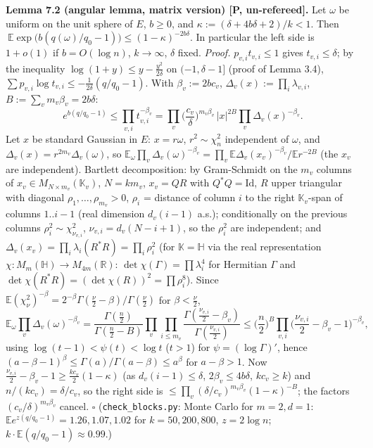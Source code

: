 \textbf{Lemma 7.2 (angular lemma, matrix version) {[}P, un-refereed{]}.} Let \(\omega\) be uniform on the unit sphere of \(E\), \(b\ge0\), and \(\kappa:=(\delta+4b\delta+2)/k<1\). Then \(\ \mathbb E\exp\big(b(q(\omega)/q_0-1)\big)\le(1-\kappa)^{-2b\delta}\). In particular the left side is \(1+o(1)\) if \(b=O(\log n)\), \(k\to\infty\), \(\delta\) fixed.
\emph{Proof.} \(p_{v,i}t_{v,i}\le1\) gives \(t_{v,i}\le\delta\); by the inequality \(\log(1+y)\le y-\frac{y^2}{2\delta}\) on \((-1,\delta-1]\) (proof of Lemma 3.4), \(\sum p_{v,i}\log t_{v,i}\le-\frac1{2\delta}(q/q_0-1)\). With \(\beta_v:=2bc_v\), \(\Delta_v(x):=\prod_i\lambda_{v,i}\), \(B:=\sum_vm_v\beta_v=2b\delta\):
\[e^{b(q/q_0-1)}\le\prod_{v,i}t_{v,i}^{-\beta_v}=\prod_v\Big(\frac{c_v}{\delta}\Big)^{m_v\beta_v}\,|x|^{2B}\prod_v\Delta_v(x)^{-\beta_v}.\]
Let \(x\) be standard Gaussian in \(E\): \(x=r\omega\), \(r^2\sim\chi^2_n\) independent of \(\omega\), and \(\Delta_v(x)=r^{2m_v}\Delta_v(\omega)\), so \(\mathbb E_\omega\prod_v\Delta_v(\omega)^{-\beta_v}=\prod_v\mathbb E\Delta_v(x_v)^{-\beta_v}/\mathbb E r^{-2B}\) (the \(x_v\) are independent). Bartlett decomposition: by Gram-Schmidt on the \(m_v\) columns of \(x_v\in M_{N\times m_v}(\mathbb K_v)\), \(N=km_v\), \(x_v=QR\) with \(Q^*Q=\mathrm{Id}\), \(R\) upper triangular with diagonal \(\rho_1,\dots,\rho_{m_v}>0\), \(\rho_i\) = distance of column \(i\) to the right \(\mathbb K_v\)-span of columns \(1..i-1\) (real dimension \(d_v(i-1)\) a.s.); conditionally on the previous columns \(\rho_i^2\sim\chi^2_{\nu_{v,i}}\), \(\nu_{v,i}=d_v(N-i+1)\), so the \(\rho_i^2\) are independent; and \(\Delta_v(x_v)=\prod_i\lambda_i(R^*R)=\prod_i\rho_i^2\) (for \(\mathbb K=\mathbb H\) via the real representation \(\chi:M_m(\mathbb H)\to M_{4m}(\mathbb R)\): \(\det\chi(\Gamma)=\prod\lambda_i^4\) for Hermitian \(\Gamma\) and \(\det\chi(R^*R)=(\det\chi(R))^2=\prod\rho_i^8\)). Since \(\mathbb E(\chi^2_\nu)^{-\beta}=2^{-\beta}\Gamma(\frac\nu2-\beta)/\Gamma(\frac\nu2)\) for \(\beta<\frac\nu2\),
\[\mathbb E_\omega\prod_v\Delta_v(\omega)^{-\beta_v}=\frac{\Gamma(\frac n2)}{\Gamma(\frac n2-B)}\prod_v\prod_{i\le m_v}\frac{\Gamma(\frac{\nu_{v,i}}2-\beta_v)}{\Gamma(\frac{\nu_{v,i}}2)}\le\Big(\frac n2\Big)^B\prod_{v,i}\Big(\frac{\nu_{v,i}}2-\beta_v-1\Big)^{-\beta_v},\]
using \(\log(t-1)<\psi(t)<\log t\) (\(t>1\)) for \(\psi=(\log\Gamma)'\), hence \((a-\beta-1)^\beta\le\Gamma(a)/\Gamma(a-\beta)\le a^\beta\) for \(a-\beta>1\). Now \(\frac{\nu_{v,i}}2-\beta_v-1\ge\frac{kc_v}2(1-\kappa)\) (as \(d_v(i-1)\le\delta\), \(2\beta_v\le4b\delta\), \(kc_v\ge k\)) and \(n/(kc_v)=\delta/c_v\), so the right side is \(\le\prod_v(\delta/c_v)^{m_v\beta_v}(1-\kappa)^{-B}\); the factors \((c_v/\delta)^{m_v\beta_v}\) cancel. \(\square\)
(\texttt{check\_blocks.py}: Monte Carlo for \(m=2,d=1\): \(\mathbb E e^{z(q/q_0-1)}=1.26,1.07,1.02\) for \(k=50,200,800\), \(z=2\log n\); \(k\cdot\mathbb E(q/q_0-1)\approx0.99\).)

